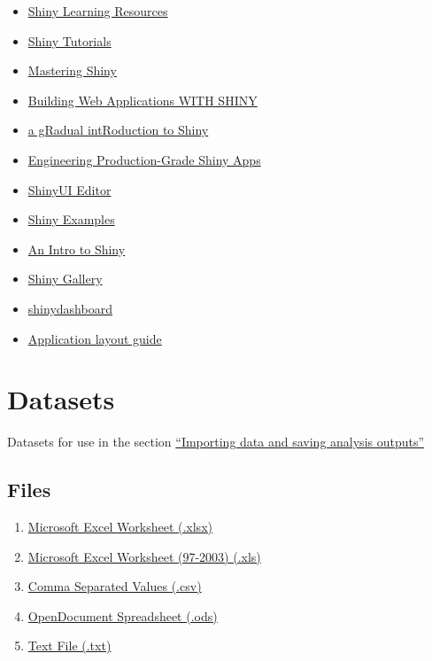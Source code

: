 \documentclass[
  letterpaper,
  DIV=11,
  numbers=noendperiod]{scrreprt}
\providecommand{\tightlist}{%
  \setlength{\itemsep}{0pt}\setlength{\parskip}{0pt}}\usepackage{longtable,booktabs,array}
\begin{document}
\begin{itemize}
\tightlist
\item
  \href{https://shiny.rstudio.com/tutorial/}{Shiny Learning Resources}
\item
  \href{https://shiny.rstudio.com/tutorial/written-tutorial/lesson1/}{Shiny
  Tutorials}
\item
  \href{https://mastering-shiny.org/}{Mastering Shiny}
\item
  \href{https://rstudio-education.github.io/shiny-course/}{Building Web
  Applications WITH SHINY}
\item
  \href{https://laderast.github.io/gradual_shiny/}{a gRadual
  intRoduction to Shiny}
\item
  \href{https://engineering-shiny.org/}{Engineering Production-Grade
  Shiny Apps}
\item
  \href{https://rstudio.github.io/shinyuieditor/}{ShinyUI Editor}
\item
  \href{https://shinylive.io/r/examples/}{Shiny Examples}
\item
  \href{https://ucsb-meds.github.io/shiny-workshop/\#1}{An Intro to
  Shiny}
\item
  \href{https://shiny.posit.co/r/gallery/}{Shiny Gallery}
\item
  \href{https://rstudio.github.io/shinydashboard/structure.html}{shinydashboard}
\item
  \href{https://shiny.posit.co/r/articles/build/layout-guide/}{Application
  layout guide}
\end{itemize}

\chapter{Datasets}\label{sec-appendix-2}

Datasets for use in the section \href{@sec-import-save}{``Importing data
and saving analysis outputs''}

\section{Files}\label{files}

\begin{enumerate}
\def\labelenumi{\arabic{enumi}.}
\tightlist
\item
  \href{datasets/r4novice_datafile.xlsx}{Microsoft Excel Worksheet
  (.xlsx)}
\item
  \href{datasets/r4novice_datafile.xls}{Microsoft Excel Worksheet
  (97-2003) (.xls)}
\item
  \href{datasets/r4novice_datafile.csv}{Comma Separated Values (.csv)}
\item
  \href{datasets/r4novice_datafile.ods}{OpenDocument Spreadsheet (.ods)}
\item
  \href{datasets/r4novice_datafile.txt}{Text File (.txt)}
\end{enumerate}
\end{document}
